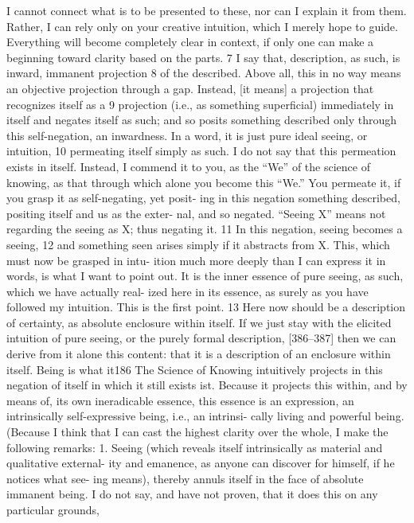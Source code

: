 I cannot connect what is to be presented to these, nor can I explain it from
them. Rather, I can rely only on your creative intuition, which I merely hope
to guide. Everything will become completely clear in context, if only one can
make a beginning toward clarity based on the parts. 7
I say that, description, as such, is inward, immanent projection 8 of the
described. Above all, this in no way means an objective projection through a
gap. Instead, [it means] a projection that recognizes itself as a 9 projection (i.e.,
as something superficial) immediately in itself and negates itself as such; and
so posits something described only through this self-negation, an inwardness.
In a word, it is just pure ideal seeing, or intuition, 10 permeating itself simply as
such. I do not say that this permeation exists in itself. Instead, I commend it
to you, as the “We” of the science of knowing, as that through which alone you
become this “We.” You permeate it, if you grasp it as self-negating, yet posit-
ing in this negation something described, positing itself and us as the exter-
nal, and so negated. “Seeing X” means not regarding the seeing as X; thus
negating it. 11 In this negation, seeing becomes a seeing, 12 and something seen
arises simply if it abstracts from X. This, which must now be grasped in intu-
ition much more deeply than I can express it in words, is what I want to point
out. It is the inner essence of pure seeing, as such, which we have actually real-
ized here in its essence, as surely as you have followed my intuition. This is the
first point. 13
Here now should be a description of certainty, as absolute enclosure
within itself. If we just stay with the elicited intuition of pure seeing, or the
purely formal description, [386–387] then we can derive from it alone this
content: that it is a description of an enclosure within itself. Being is what it186
The Science of Knowing
intuitively projects in this negation of itself in which it still exists {ist}. Because
it projects this within, and by means of, its own ineradicable essence, this
essence is an expression, an intrinsically self-expressive being, i.e., an intrinsi-
cally living and powerful being.
(Because I think that I can cast the highest clarity over the whole, I
make the following remarks:
1. Seeing (which reveals itself intrinsically as material and qualitative external-
ity and emanence, as anyone can discover for himself, if he notices what see-
ing means), thereby annuls itself in the face of absolute immanent being. I
do not say, and have not proven, that it does this on any particular grounds,
